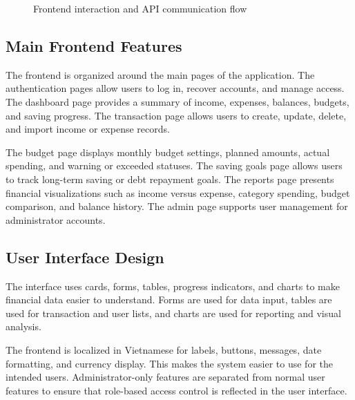 \documentclass{article}
\begin{document}
\begin{figure}[H]
{
}
\caption{Frontend interaction and API communication flow}
\label{fig:frontend-interaction-flow}
\end{figure}

\subsection{Main Frontend Features}

The frontend is organized around the main pages of the application. The authentication pages allow users to log in, recover accounts, and manage access. The dashboard page provides a summary of income, expenses, balances, budgets, and saving progress. The transaction page allows users to create, update, delete, and import income or expense records.

The budget page displays monthly budget settings, planned amounts, actual spending, and warning or exceeded statuses. The saving goals page allows users to track long-term saving or debt repayment goals. The reports page presents financial visualizations such as income versus expense, category spending, budget comparison, and balance history. The admin page supports user management for administrator accounts.

\subsection{User Interface Design}

The interface uses cards, forms, tables, progress indicators, and charts to make financial data easier to understand. Forms are used for data input, tables are used for transaction and user lists, and charts are used for reporting and visual analysis.

The frontend is localized in Vietnamese for labels, buttons, messages, date formatting, and currency display. This makes the system easier to use for the intended users. Administrator-only features are separated from normal user features to ensure that role-based access control is reflected in the user interface.
\end{document}
